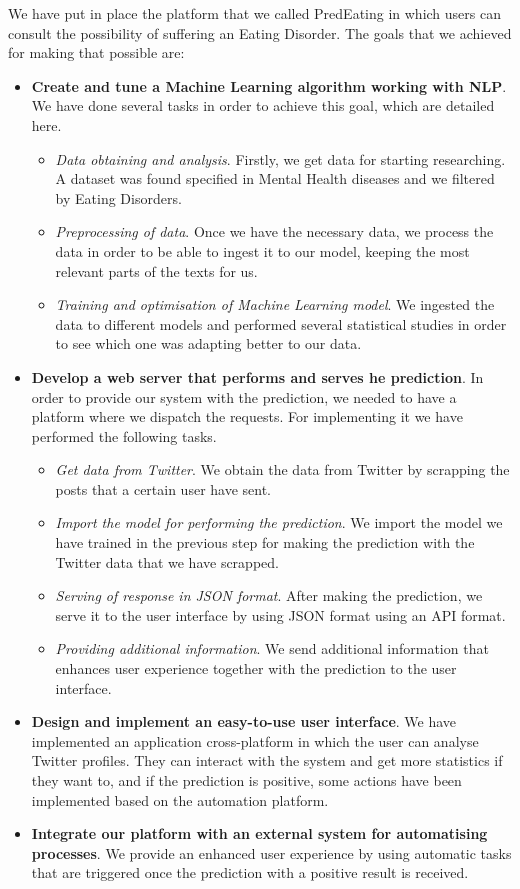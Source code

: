  We have put in place the platform that we called PredEating in which users can consult the possibility of suffering an Eating Disorder. The goals that we achieved for making that possible are:
\begin{itemize}
    \item \textbf{Create and tune a Machine Learning algorithm working with NLP}. We have done several tasks in order to achieve this goal, which are detailed here.
    \begin{itemize}
        \item \textit{Data obtaining and analysis}. Firstly, we get data for starting researching. A dataset was found specified in Mental Health diseases and we filtered by Eating Disorders.
        \item \textit{Preprocessing of data}. Once we have the necessary data, we process the data in order to be able to ingest it to our model, keeping the most relevant parts of the texts for us.
        \item \textit{Training and optimisation of Machine Learning model}. We ingested the data to different models and performed several statistical studies in order to see which one was adapting better to our data.
    \end{itemize}
    \item \textbf{Develop a web server that performs and serves he prediction}. In order to provide our system with the prediction, we needed to have a platform where we dispatch the requests. For implementing it we have performed the following tasks.
    \begin{itemize}
        \item \textit{Get data from Twitter}. We obtain the data from Twitter by scrapping the posts that a certain user have sent.
        \item \textit{Import the model for performing the prediction}. We import the model we have trained in the previous step for making the prediction with the Twitter data that we have scrapped.
        \item \textit{Serving of response in JSON format}. After making the prediction, we serve it to the user interface by using JSON format using an API format.
        \item \textit{Providing additional information}. We send additional information that enhances user experience together with the prediction to the user interface.
    \end{itemize}
    \item \textbf{Design and implement an easy-to-use user interface}. We have implemented an application cross-platform in which the user can analyse Twitter profiles. They can interact with the system and get more statistics if they want to, and if the prediction is positive, some actions have been implemented based on the automation platform.
    \item \textbf{Integrate our platform with an external system for automatising processes}. We provide an enhanced user experience by using automatic tasks that are triggered once the prediction with a positive result is received.
\end{itemize}


